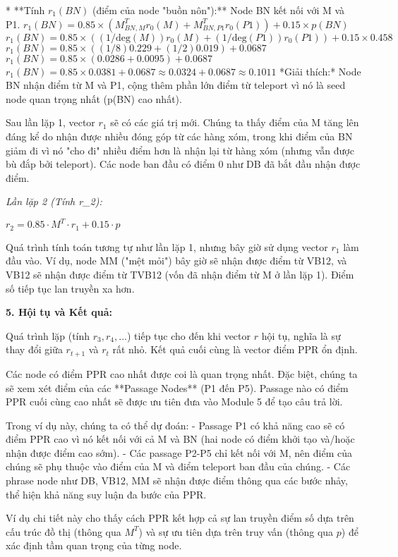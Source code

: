 \documentclass[../main.tex]{subfiles}
\begin{document}
*   **Tính \(r_1(BN)\) (điểm của node "buồn nôn"):**
    Node BN kết nối với M và P1.
    \(r_1(BN) = 0.85 \times ( M^T_{BN, M}r_0(M) + M^T_{BN, P1}r_0(P1) ) + 0.15 \times p(BN)\)
    \(r_1(BN) = 0.85 \times ( (1/\text{deg}(M))r_0(M) + (1/\text{deg}(P1))r_0(P1) ) + 0.15 \times 0.458\)
    \(r_1(BN) = 0.85 \times ( (1/8)0.229 + (1/2)0.019 ) + 0.0687\)
    \(r_1(BN) = 0.85 \times ( 0.0286 + 0.0095 ) + 0.0687\)
    \(r_1(BN) = 0.85 \times 0.0381 + 0.0687 \approx 0.0324 + 0.0687 \approx 0.1011\)
    *Giải thích:* Node BN nhận điểm từ M và P1, cộng thêm phần lớn điểm từ teleport vì nó là seed node quan trọng nhất (p(BN) cao nhất).

Sau lần lặp 1, vector \(r_1\) sẽ có các giá trị mới. Chúng ta thấy điểm của M tăng lên đáng kể do nhận được nhiều đóng góp từ các hàng xóm, trong khi điểm của BN giảm đi vì nó "cho đi" nhiều điểm hơn là nhận lại từ hàng xóm (nhưng vẫn được bù đắp bởi teleport). Các node ban đầu có điểm 0 như DB đã bắt đầu nhận được điểm.

\textit{Lần lặp 2 (Tính r_2):}

\(r_2 = 0.85 \cdot M^T \cdot r_1 + 0.15 \cdot p\)

Quá trình tính toán tương tự như lần lặp 1, nhưng bây giờ sử dụng vector \(r_1\) làm đầu vào. Ví dụ, node MM ("mệt mỏi") bây giờ sẽ nhận được điểm từ VB12, và VB12 sẽ nhận được điểm từ TVB12 (vốn đã nhận điểm từ M ở lần lặp 1). Điểm số tiếp tục lan truyền xa hơn.

\textbf{5. Hội tụ và Kết quả:}

Quá trình lặp (tính \(r_3, r_4, ...\)) tiếp tục cho đến khi vector \(r\) hội tụ, nghĩa là sự thay đổi giữa \(r_{t+1}\) và \(r_t\) rất nhỏ. Kết quả cuối cùng là vector điểm PPR ổn định.

Các node có điểm PPR cao nhất được coi là quan trọng nhất. Đặc biệt, chúng ta sẽ xem xét điểm của các **Passage Nodes** (P1 đến P5). Passage nào có điểm PPR cuối cùng cao nhất sẽ được ưu tiên đưa vào Module 5 để tạo câu trả lời.

Trong ví dụ này, chúng ta có thể dự đoán:
- Passage P1 có khả năng cao sẽ có điểm PPR cao vì nó kết nối với cả M và BN (hai node có điểm khởi tạo và/hoặc nhận được điểm cao sớm).
- Các passage P2-P5 chỉ kết nối với M, nên điểm của chúng sẽ phụ thuộc vào điểm của M và điểm teleport ban đầu của chúng.
- Các phrase node như DB, VB12, MM sẽ nhận được điểm thông qua các bước nhảy, thể hiện khả năng suy luận đa bước của PPR.

Ví dụ chi tiết này cho thấy cách PPR kết hợp cả sự lan truyền điểm số dựa trên cấu trúc đồ thị (thông qua \(M^T\)) và sự ưu tiên dựa trên truy vấn (thông qua \(p\)) để xác định tầm quan trọng của từng node.
\end{document}
